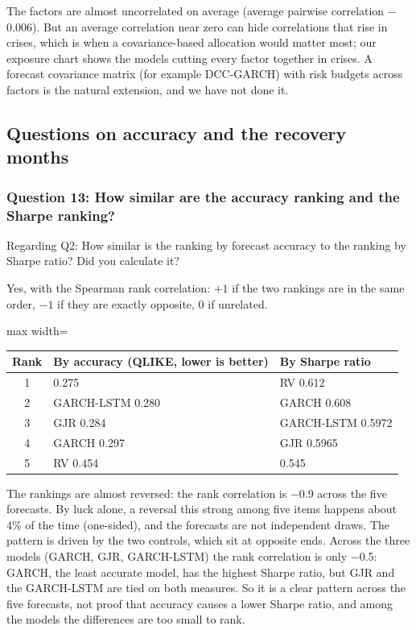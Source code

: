 The factors are almost uncorrelated on average (average pairwise correlation $-$0.006). But an average correlation near zero can hide correlations that rise in crises, which is when a covariance-based allocation would matter most; our exposure chart shows the models cutting every factor together in crises. A forecast covariance matrix (for example DCC-GARCH) with risk budgets across factors is the natural extension, and we have not done it.

\subsection{Questions on accuracy and the recovery months}

\subsubsection*{Question 13: How similar are the accuracy ranking and the Sharpe ranking?}
\begin{question}
Regarding Q2: How similar is the ranking by forecast accuracy to the ranking by Sharpe ratio? Did you calculate it?
\end{question}
Yes, with the Spearman rank correlation: $+1$ if the two rankings are in the same order, $-1$ if they are exactly opposite, 0 if unrelated.
\begin{center}\small
\begin{adjustbox}{max width=\linewidth}\begin{tabular}{@{}cll@{}}
\toprule
Rank & By accuracy (QLIKE, lower is better) & By Sharpe ratio\\
\midrule
1 & \VIX{} 0.275 & RV 0.612\\
2 & GARCH-LSTM 0.280 & GARCH 0.608\\
3 & GJR 0.284 & GARCH-LSTM 0.5972\\
4 & GARCH 0.297 & GJR 0.5965\\
5 & RV 0.454 & \VIX{} 0.545\\
\bottomrule
\end{tabular}\end{adjustbox}
\end{center}
The rankings are almost reversed: the rank correlation is $-$0.9 across the five forecasts. By luck alone, a reversal this strong among five items happens about 4\% of the time (one-sided), and the forecasts are not independent draws. The pattern is driven by the two controls, which sit at opposite ends. Across the three models (GARCH, GJR, GARCH-LSTM) the rank correlation is only $-$0.5: GARCH, the least accurate model, has the highest Sharpe ratio, but GJR and the GARCH-LSTM are tied on both measures. So it is a clear pattern across the five forecasts, not proof that accuracy causes a lower Sharpe ratio, and among the models the differences are too small to rank.

